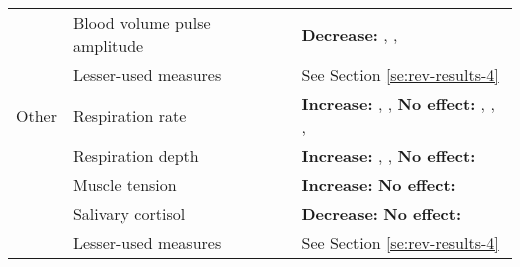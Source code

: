 \begin{table}[t!]
\begin{threeparttable}
\begin{tabular*}{\textwidth}{
    >{\raggedright}p{}
    >{\raggedright}p{}
    >{\raggedright\arraybackslash}p{}}
\cline{2-3}
& Blood volume pulse amplitude & 
    \textbf{Decrease:} \textcite{benedek2011}, \textcite{salimpoor2009}, \textcite{salimpoor2011} \\ 
    
\cline{2-3}
& Lesser-used measures & 
    See Section \ref{se:rev-results-4} \\
                       
\hline
Other & Respiration rate & 
    \textbf{Increase:} \textcite{baltes2011}, \textcite{salimpoor2009}, \textcite{salimpoor2011} 
    \newline 
    \textbf{No effect:} \textcite{benedek2011}, \textcite{grewe2011}, \textcite{mori2017}, \textcite{sumpf2015} \\
    
\cline{2-3}
& Respiration depth & 
    \textbf{Increase:} \textcite{benedek2011}, \textcite{blood2001}, \textcite{grewe2009a} 
    \newline 
    \textbf{No effect:} \textcite{mori2017} \\
    
\cline{2-3}
& Muscle tension & 
    \textbf{Increase:} \textcite{blood2001} 
    \newline 
    \textbf{No effect:} \textcite{rickard2004} \\
    
\cline{2-3}
& Salivary cortisol & 
    \textbf{Decrease:} \textcite{fukui2013} 
    \newline 
    \textbf{No effect:} \textcite{rickard2004} \\
    
\cline{2-3}
& Lesser-used measures & 
    See Section \ref{se:rev-results-4} \\
    
\hline

\end{tabular*}
\end{threeparttable}
\end{table}